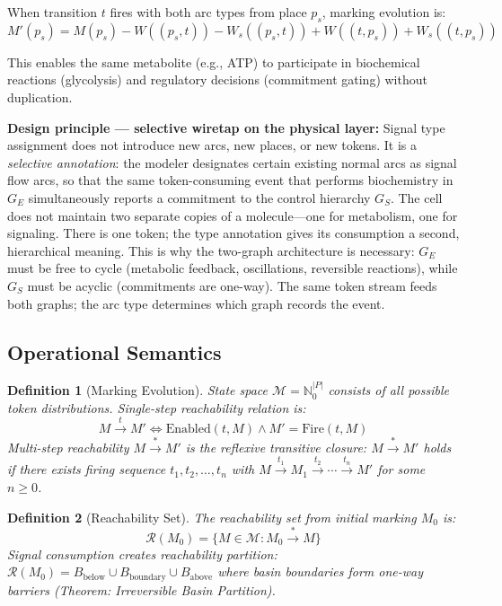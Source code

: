 \documentclass[10pt,letterpaper]{article}
\newtheorem{definition}{Definition}
\providecommand{\DIFaddtex}[1]{{\protect\color{blue}\uwave{#1}}} %
\providecommand{\DIFdeltex}[1]{{\protect\color{red}\sout{#1}}}                      %
\providecommand{\DIFaddbegin}{} %
\providecommand{\DIFaddend}{} %
\providecommand{\DIFdelbegin}{} %
\providecommand{\DIFdelend}{} %
\providecommand{\DIFadd}[1]{\texorpdfstring{\DIFaddtex{#1}}{#1}} %
\providecommand{\DIFdel}[1]{\texorpdfstring{\DIFdeltex{#1}}{}} %
\newcommand{\DIFscaledelfig}{0.5}
\newlength{\DIFdelgraphicswidth} %
\newlength{\DIFdelgraphicsheight} %
\newcommand{\DIFaddincludegraphics}[2][]{{\color{blue}\fbox{\DIFOincludegraphics[#1]{#2}}}} %
\newcommand{\DIFdelincludegraphics}[2][]{%
\sbox{\DIFdelgraphicsbox}{\DIFOincludegraphics[#1]{#2}}%
\settoboxwidth{\DIFdelgraphicswidth}{\DIFdelgraphicsbox} %
\settoboxtotalheight{\DIFdelgraphicsheight}{\DIFdelgraphicsbox} %
\scalebox{\DIFscaledelfig}{%
\parbox[b]{\DIFdelgraphicswidth}{\usebox{\DIFdelgraphicsbox}\\[-\baselineskip] \rule{\DIFdelgraphicswidth}{0em}}\llap{\resizebox{\DIFdelgraphicswidth}{\DIFdelgraphicsheight}{%
\setlength{\unitlength}{\DIFdelgraphicswidth}%
\begin{picture}(1,1)%
\thicklines\linethickness{2pt} %
{\color[rgb]{1,0,0}\put(0,0){\framebox(1,1){}}}%
{\color[rgb]{1,0,0}\put(0,0){\line( 1,1){1}}}%
{\color[rgb]{1,0,0}\put(0,1){\line(1,-1){1}}}%
\end{picture}%
}\hspace*{3pt}}} %
} %
\DeclareRobustCommand{\DIFaddbegin}{\DIFOaddbegin \let\includegraphics\DIFaddincludegraphics} %
\DeclareRobustCommand{\DIFaddend}{\DIFOaddend \let\includegraphics\DIFOincludegraphics} %
\DeclareRobustCommand{\DIFdelbegin}{\DIFOdelbegin \let\includegraphics\DIFdelincludegraphics} %
\DeclareRobustCommand{\DIFdelend}{\DIFOaddend \let\includegraphics\DIFOincludegraphics} %
\begin{document}
When transition $t$ fires with both arc types from place $p_s$, marking evolution is:
\begin{equation}
M'(p_s) = M(p_s) - W((p_s,t)) - W_s((p_s,t)) + W((t,p_s)) + W_s((t,p_s))
\end{equation}

This enables the same metabolite (e.g., ATP) to participate in biochemical reactions (glycolysis) and regulatory decisions (commitment gating) without duplication.

\textbf{Design principle --- selective wiretap on the physical layer:} Signal type assignment does not introduce new arcs, new places, or new tokens. It is a \textit{selective annotation}: the modeler designates certain existing normal arcs as signal flow arcs, so that the same token-consuming event that performs biochemistry in $G_E$ simultaneously reports a commitment to the control hierarchy \DIFdelbegin \DIFdel{$G_S$}\DIFdelend \DIFaddbegin \DIFadd{$G_s$}\DIFaddend . The cell does not maintain two separate copies of a molecule---one for metabolism, one for signaling. There is one token; the type annotation gives its consumption a second, hierarchical meaning. This is why the two-graph architecture is necessary: $G_E$ must be free to cycle (metabolic feedback, oscillations, reversible reactions), while \DIFdelbegin \DIFdel{$G_S$ }\DIFdelend \DIFaddbegin \DIFadd{$G_s$ }\DIFaddend must be acyclic (commitments are one-way). The same token stream feeds both graphs; the arc type determines which graph records the event.

\subsection{Operational Semantics}

\begin{definition}[Marking Evolution]
State space $\mathcal{M} = \mathbb{N}_0^{|P|}$ consists of all possible token distributions. Single-step reachability relation is:
\begin{equation}
M \xrightarrow{t} M' \iff \text{Enabled}(t, M) \wedge M' = \text{Fire}(t, M)
\end{equation}
Multi-step reachability $M \xrightarrow{*} M'$ is the reflexive transitive closure: $M \xrightarrow{*} M'$ holds if there exists firing sequence $t_1, t_2, \ldots, t_n$ with $M \xrightarrow{t_1} M_1 \xrightarrow{t_2} \cdots \xrightarrow{t_n} M'$ for some $n \geq 0$.
\end{definition}

\begin{definition}[Reachability Set]
The reachability set from initial marking $M_0$ is:
\begin{equation}
\mathcal{R}(M_0) = \{M \in \mathcal{M} : M_0 \xrightarrow{*} M\}
\end{equation}
Signal consumption creates reachability partition: $\mathcal{R}(M_0) = B_{\text{below}} \cup B_{\text{boundary}} \cup B_{\text{above}}$ where basin boundaries form one-way barriers (Theorem: Irreversible Basin Partition).
\end{definition}
\end{document}
